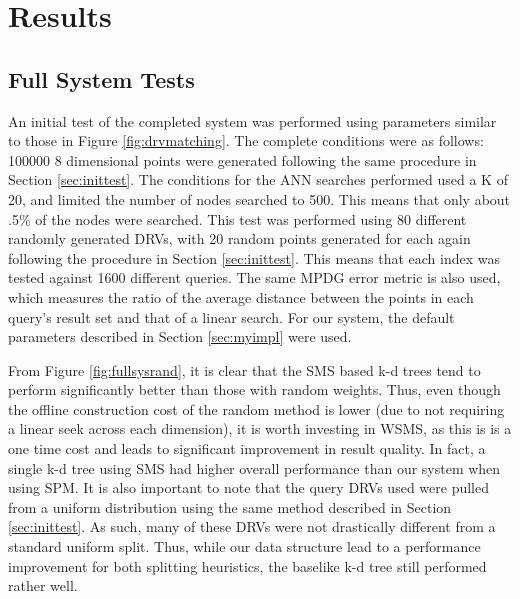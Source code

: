 \chapter{Results} %

\label{results} %


\section{Full System Tests}
\label{sec:fullsystest}

An initial test of the completed system was performed using parameters similar to those in Figure \ref{fig:drvmatching}.  The complete conditions were as follows: 100000 8 dimensional points were generated following the same procedure in Section \ref{sec:inittest}.  The conditions for the ANN searches performed used a K of 20, and limited the number of nodes searched to 500.  This means that only about .5\% of the nodes were searched.  This test was performed using 80 different randomly generated DRVs, with 20 random points generated for each again following the procedure in Section \ref{sec:inittest}.  This means that each index was tested against 1600 different queries.  The same MPDG error metric is also used, which measures the ratio of the average distance between the points in each query's result set and that of a linear search.  For our system, the default parameters described in Section \ref{sec:myimpl} were used.

From Figure \ref{fig:fullsysrand}, it is clear that the SMS based k-d trees tend to perform significantly better than those with random weights.  Thus, even though the offline construction cost of the random method is lower (due to not requiring a linear seek across each dimension), it is worth investing in WSMS, as this is is a one time cost and leads to significant improvement in result quality.  In fact, a single k-d tree using SMS had higher overall performance than our system when using SPM.  It is also important to note that the query DRVs used were pulled from a uniform distribution using the same method described in Section \ref{sec:inittest}.  As such, many of these DRVs were not drastically different from a standard uniform split.  Thus, while our data structure lead to a performance improvement for both splitting heuristics, the baselike k-d tree still performed rather well.

